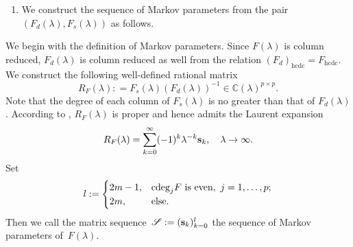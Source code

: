 \documentclass[12pt,reqno]{amsart}
\theoremstyle{plain}
\numberwithin{equation}{section}
\theoremstyle{remark}
\newcommand{\coloneqq}{\mathrel{\mathop:}=}
\begin{document}
\begin{enumerate}[label=\textbf{Step \arabic*}, start=3, align=left]
\item \label{step3}
We construct the sequence of Markov parameters from the pair $(F_d(\lambda),F_s(\lambda))$ as follows. 
\end{enumerate}

  We begin with the  definition of Markov parameters.  Since $F(\lambda)$ is column reduced,    $F_d(\lambda)$ is column reduced as well from the relation $(F_d)_{\mathrm{hcdc}}=F_{\mathrm{hcdc}}$. 
We construct the following well-defined rational matrix
\begin{equation}\label{Ge}        R_F(\lambda)\coloneqq F_{s}(\lambda)(F_{d}(\lambda))^{-1}\in \mathbb C(\lambda)^{p\times p}.
\end{equation}  
Note that the degree of each column of $F_s(\lambda)$ is no greater than that of $F_d(\lambda)$. 
According to \cite[Lemma 6.3-11]{Kai}, $R_F(\lambda)$ is proper and hence
    admits the Laurent expansion
    \begin{equation}
R_F(\lambda)=\sum_{k=0}^{\infty} (-1)^{k}\lambda^{-k}{\bf s}_k,\quad \lambda\rightarrow \infty. \label{MakrovPE} 
    \end{equation}
Set
$$
l:=\begin{cases}
2m-1, & {\rm cdeg}_j F\ \mbox{\rm is even},\ j=1,\ldots,p;  \\
2m, & {\rm else}.
\end{cases}
$$ 
Then we call the matrix
    sequence~$\mathscr S:=({\bf s}_k)_{k=0}^{l}$ the sequence of
    Markov parameters 
of~$F(\lambda)$.\label{item:def2_i}
\end{document}
